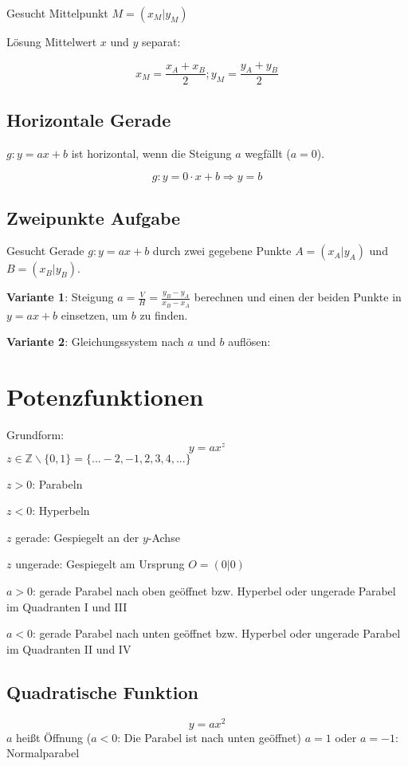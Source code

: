 \begin{multicols}{2}
Gesucht Mittelpunkt $M=(x_M|y_M)$

Lösung Mittelwert $x$ und $y$ separat:

$$x_M = \frac{x_A+x_B}2; y_M=\frac{y_A+y_B}2$$

\subsection{Horizontale Gerade}

$g: y=ax+b$ ist horizontal, wenn die Steigung $a$ wegfällt ($a=0$).

$$g:  y=0\cdot{}x+b \Rightarrow y=b$$

\subsection{Zweipunkte Aufgabe}
Gesucht Gerade $g: y=ax+b$ durch zwei gegebene Punkte $A=(x_A|y_A)$
und $B=(x_B|y_B)$.

\textbf{Variante 1}: Steigung $a = \frac{V}H
= \frac{y_B-y_A}{x_B-x_A}$ berechnen und einen der beiden Punkte in
$y=ax+b$ einsetzen, um $b$ zu finden.

\textbf{Variante 2}: Gleichungssystem nach $a$ und $b$ auf\/lösen:


\section{Potenzfunktionen}
Grundform:
$$y=ax^z$$
$z\in\mathbb{Z}\backslash\{0,1\} = \{...-2, -1, 2, 3, 4, ...\}$

$z>0$: Parabeln

$z<0$: Hyperbeln

$z$ gerade: Gespiegelt an der $y$-Achse

$z$ ungerade: Gespiegelt am Ursprung $O=(0|0)$

$a>0$: gerade Parabel nach oben geöffnet bzw. Hyperbel oder ungerade
Parabel im Quadranten I und III

$a<0$: gerade Parabel nach unten geöffnet bzw. Hyperbel oder ungerade
Parabel im Quadranten II und IV


\subsection{Quadratische Funktion}
$$y=ax^2$$
$a$ heißt Öffnung ($a<0$: Die Parabel ist nach unten geöffnet)
$a=1$ oder $a=-1$: Normalparabel



\end{multicols}
